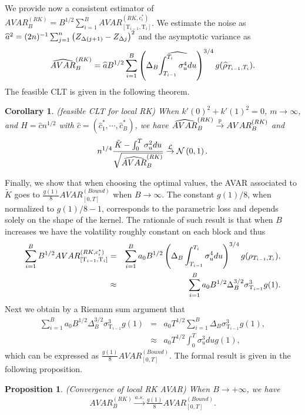\documentclass[11pt]{article}
\numberwithin{equation}{section}
\newcommand{\Tau}{\mathrm{T}}
\theoremstyle{plain}
\newtheorem{RKcor}[RK0]{Corollary}
\newtheorem{propAVARRK}[RK0]{Proposition}
\theoremstyle{remark}
\begin{document}
We provide now a consistent estimator of $AVAR_{B}^{(RK)} = B^{1/2} \sum_{i=1}^B  AVAR_{[\Tau_{i-1}, \Tau_i]}^{(RK,c_i^*)}$. We estimate the noise as $\widehat{a}^2 = (2n)^{-1} \sum_{j=1}^{n}{\left(Z_{\Delta(j+1)} - Z_{\Delta j} \right)^2}$ and the asymptotic variance as
$$\widehat{AVAR}_B^{(RK)} =  \widehat{a}  B^{1/2} \sum_{i=1}^B \left( \Delta_B \widehat{\int_{T_{i-1}}^{T_i} \sigma_u^4 du} \right)^{3/4} g (\widehat{\rho}_{T_{i-1},T_i}).$$
The feasible CLT is given in the following theorem.
\begin{RKcor}
\label{RKcor} (feasible CLT for local RK) When $k'(0)^2 + k'(1)^2 =0$, $m \rightarrow \infty$, and $H = \widehat{c} n^{1/2}$ with $\widehat{c}=(\widehat{c}_1^*, \cdots, \widehat{c}_B^*)$, we have $\widehat{AVAR}_B^{(RK)} \overset{\mathbb{P}}{\rightarrow} AVAR_{B}^{(RK)}$ and
\begin{eqnarray}
\label{RKthcor2}
n^{1/4} \frac{ \tilde{K} - \int_0^T \sigma_u^2 du}{\sqrt{\widehat{AVAR}_B^{(RK)}}}\overset{{\cal L}}{\rightarrow}  {\cal N} \left(0, 1\right).
\end{eqnarray}
\end{RKcor}

\smallskip
Finally, we show that when choosing the optimal values, the AVAR associated to $\tilde{K}$ goes to $\frac{g(1)}{8} AVAR_{[0,T]}^{(Bound)}$ when $B \rightarrow \infty$. The constant $g(1)/8$, when normalized to $g(1)/8 - 1$, corresponds to the parametric loss and depends solely on the shape of the kernel. The rationale of such result is that when $B$ increases we have the volatility roughly constant on each block and thus
\begin{eqnarray*}
\sum_{i=1}^B B^{1/2} AVAR_{[\Tau_{i-1}, \Tau_i]}^{(RK,c_i^*)} & = & \sum_{i=1}^B a_0 B^{1/2} \l( \Delta_B \int_{T_{i-1}}^{T_i} \sigma_u^4 du \r)^{3/4} g (\rho_{T_{i-1},T_i}),\\
& \approx & \sum_{i=1}^B a_0 B^{1/2} \Delta_B^{3/2} \sigma_{\Tau_{i-1}}^3 g (1).
\end{eqnarray*}
Next we obtain by a Riemann sum argument that
\begin{eqnarray*}
\sum_{i=1}^B a_0 B^{1/2} \Delta_B^{3/2} \sigma_{\Tau_{i-1}}^3 g (1) & = & a_0 T^{1/2} \sum_{i=1}^B \Delta_B \sigma_{\Tau_{i-1}}^3 g (1),\\
& \approx & a_0 T^{1/2} \int_0^T \sigma_u^3 du g (1),
\end{eqnarray*}
which can be expressed as $\frac{g(1)}{8} AVAR_{[0,T]}^{(Bound)}$. The formal result is given in the following proposition.
\begin{propAVARRK} \label{propAVARRK}
(Convergence of local RK AVAR)  When $B \to +\infty$, we have
\begin{eqnarray}
\label{eqAVARRK}
AVAR_{B}^{(RK)} \overset{a.s.}{\rightarrow} \frac{g(1)}{8} AVAR_{[0,T]}^{(Bound)}.
\end{eqnarray}
\end{propAVARRK}
\end{document}
